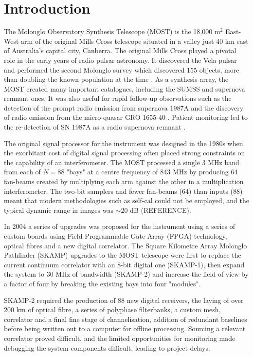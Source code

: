 \section{Introduction} 
The Molonglo Observatory Synthesis Telescope (MOST) is the 18,000 m$^2$ East-West arm of the original Mills Cross telescope situated in a valley just 40 km east of Australia's capital city, Canberra. The original Mills Cross played a pivotal role in the early years of radio pulsar astronomy. It discovered the Vela pulsar \citep{LARGE_1968} and performed the second Molonglo survey which discovered 155 objects, more than doubling the known population at the time \citep{Manchester_1978}. As a synthesis array, the MOST created many important catalogues, including the SUMSS \citep{Bock_1999,Mauch_2003} and supernova remnant \citep{Whiteoak_1996} ones. It was also useful for rapid follow-up observations such as the detection of the prompt radio emission from supernova 1987A \citep{Turtle_1987} and the discovery of radio emission from the micro-quasar GRO 1655-40 \citep{Tingay_1995}. Patient monitoring led to the re-detection of SN 1987A as a radio supernova remnant \citep{Staveley_Smith_1992}.

The original signal processor \citep{Robertson_1991} for the instrument was designed in the 1980s when the exorbitant cost of digital signal processing often placed strong constraints on the capability of an interferometer. The MOST processed a single 3 MHz band from each of $N=88$ "bays" at a centre frequency of 843 MHz by producing 64 fan-beams created by multiplying each arm against the other in a multiplication interferometer. The two-bit samplers and fewer fan-beams (64) than inputs (88) meant that modern methodologies such as self-cal could not be employed, and the typical dynamic range in images was $\sim$20 dB (REFERENCE). 

In 2004 a series of upgrades was proposed for the instrument using a series of custom boards using Field Programmable Gate Array (FPGA) technology, optical fibres and a new digital correlator\citep{Adams_2004}. The Square Kilometre Array Molonglo Pathfinder (SKAMP) upgrades to the MOST telescope were first to replace the current continuum correlator with an 8-bit digital one (SKAMP-1), then expand the system to 30 MHz of bandwidth (SKAMP-2) and increase the field of view by a factor of four by breaking the existing bays into four "modules".

SKAMP-2 required the production of 88 new digital receivers, the laying of over 200 km of optical fibre, a series of polyphase filterbanks, a custom mesh, correlator and a final fine stage of channelisation, addition of redundant baselines before being written out to a computer for offline processing\citep{Adams_2004}. Sourcing a relevant correlator proved difficult, and the limited opportunities for monitoring made debugging the system components difficult, leading to project delays.

